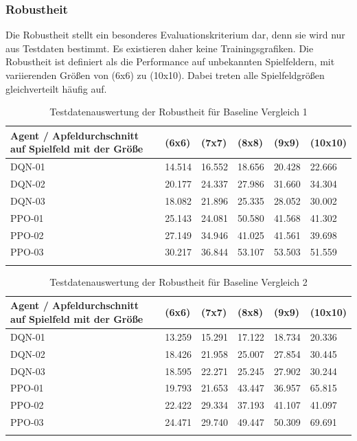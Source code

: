 \subsubsection{Robustheit}
Die Robustheit stellt ein besonderes Evaluationskriterium dar, denn sie wird nur aus Testdaten bestimmt. Es existieren daher keine Trainingsgrafiken. Die Robustheit ist definiert als die Performance auf unbekannten Spielfeldern, mit variierenden Größen von (6x6) zu (10x10). Dabei treten alle Spielfeldgrößen gleichverteilt häufig auf.
\begin{longtable}[h]{|p{4.8cm}|p{1.5cm}|p{1.5cm}|p{1.5cm}|p{1.5cm}|p{1.5cm}|}
	\hline
	Agent / Apfeldurchschnitt auf Spielfeld mit der Größe & (6x6) & (7x7) & (8x8) & (9x9) & (10x10) \\
	\hline
	DQN-01 & 14.514 & 16.552 & 18.656 & 20.428 & 22.666 \\
	\hline
	DQN-02 & 20.177 & 24.337 & 27.986 & 31.660 & 34.304 \\
	\hline
	DQN-03 & 18.082 & 21.896 & 25.335 & 28.052 & 30.002 \\
	\hline
	PPO-01 & 25.143 & 24.081 & 50.580 & 41.568 & 41.302 \\
	\hline
	PPO-02 & 27.149 & 34.946 & 41.025 & 41.561 & 39.698 \\
	\hline
	PPO-03 & 30.217 & 36.844 & 53.107 & 53.503 & 51.559 \\
	\hline
	\caption{Testdatenauswertung der Robustheit für Baseline Vergleich 1}
	\label{tab:Evaluation_Testdaten_Robustheit_1} 
\end{longtable}
\begin{longtable}[h]{|p{4.8cm}|p{1.5cm}|p{1.5cm}|p{1.5cm}|p{1.5cm}|p{1.5cm}|}
	\hline
	Agent / Apfeldurchschnitt auf Spielfeld mit der Größe & (6x6) & (7x7) & (8x8) & (9x9) & (10x10) \\
	\hline
	DQN-01 & 13.259 & 15.291 & 17.122 & 18.734 & 20.336 \\
	\hline
	DQN-02 & 18.426 & 21.958 & 25.007 & 27.854 & 30.445 \\
	\hline
	DQN-03 & 18.595 & 22.271 & 25.245 & 27.902 & 30.244 \\
	\hline
	PPO-01 & 19.793 & 21.653 & 43.447 & 36.957 & 65.815 \\
	\hline
	PPO-02 & 22.422 & 29.334 & 37.193 & 41.107 & 41.097 \\
	\hline
	PPO-03 & 24.471 & 29.740 & 49.447 & 50.309 & 69.691 \\
	\hline
	\caption{Testdatenauswertung der Robustheit für Baseline Vergleich 2}
	\label{tab:Evaluation_Testdaten_Robustheit_2} 
\end{longtable}
